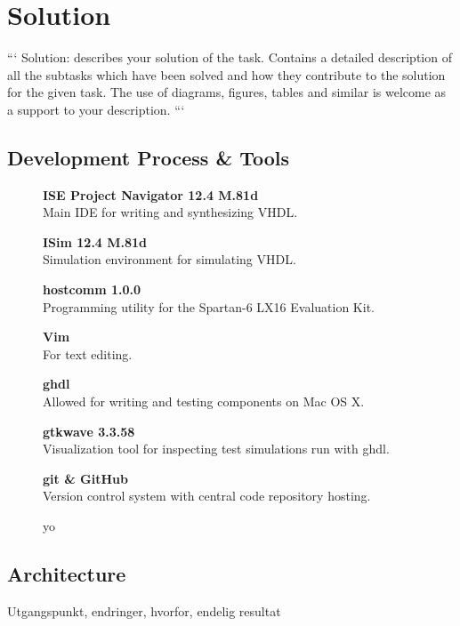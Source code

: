 \section{Solution}

```
Solution: describes your solution of the task.
Contains a detailed description of all the subtasks which have been solved and how they contribute to the solution for the given task.
The use of diagrams, figures, tables and similar is welcome as a support to your description.
```

\subsection{Development Process \& Tools}

\begin{figure}[ht!]
    \begin{description}
        \item{\textbf{ISE Project Navigator 12.4 M.81d}} \\
            Main IDE for writing and synthesizing VHDL.
        \item{\textbf{ISim 12.4 M.81d}} \\
            Simulation environment for simulating VHDL.
        \item{\textbf{hostcomm 1.0.0}} \\
            Programming utility for the Spartan-6 LX16 Evaluation Kit.
        \item{\textbf{Vim}} \\
            For text editing.
        \item{\textbf{ghdl}} \\
            Allowed for writing and testing components on Mac OS X.
        \item{\textbf{gtkwave 3.3.58}} \\
            Visualization tool for inspecting test simulations run with ghdl.
        \item{\textbf{git \& GitHub}} \\
            Version control system with central code repository hosting.
    \end{description}
    \caption{yo}
\end{figure}

\subsection{Architecture}

Utgangspunkt, endringer, hvorfor, endelig resultat

